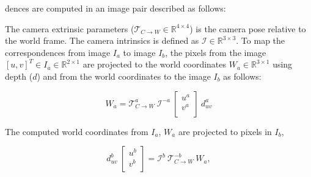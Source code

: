 dences are computed in an image pair described as follows:

\noindent The camera extrinsic parameters ($\mathcal{T}_{C \rightarrow W} \in \mathbb{R}^{4 \times 4}$) is the camera pose relative to the world frame.
The camera intrinsics is defined as $\mathcal{I} \in  \mathbb{R}^{3 \times 3}$.
To map the correspondences from image $I_a$ to image $I_b$, the pixels from the image $[u,v]^T \in I_a \in \mathbb{R}^{2 \times 1}$
are projected to the world coordinates $W_a \in \mathbb{R}^{3 \times 1}$ using depth ($d$) and from the world coordinates to the image $I_b$ as follows:

\begin{equation}
    \label{eqn:world_proj}
    W_a = \mathcal{T}_{C \rightarrow W}^a \ \mathcal{I}^{-a} \ \begin{bmatrix}
        u^a \\
        v^a \\
    \end{bmatrix} \ d_{uv}^a
\end{equation}

The computed world coordinates from $I_a$, $W_a$ are projected to pixels in $I_b$,

\begin{equation}
    d_{uv}^b \ \begin{bmatrix}
        u^b \\
        v^b \\
    \end{bmatrix} =  \mathcal{I}^b \ \mathcal{T}_{C \rightarrow W}^{-b} \ W_a,
\end{equation}

